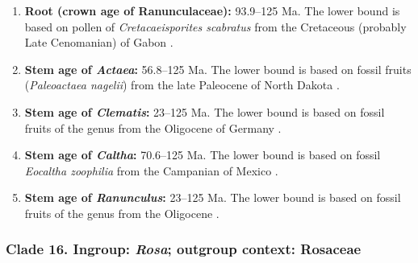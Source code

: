 \documentclass[10pt]{article}
\begin{document}
\begin{enumerate}
\item \textbf{Root (crown age of Ranunculaceae):} 93.9--125 Ma. The
  lower bound is based on pollen of \textit{Cretacaeisporites
    scabratus} from the Cretaceous (probably Late Cenomanian) of Gabon
  \citep{Ward1994}.

\item \textbf{Stem age of \textit{Actaea}:} 56.8--125 Ma. The lower
  bound is based on fossil fruits (\textit{Paleoactaea nagelii}) from
  the late Paleocene of North Dakota \citep{Pigg2005}.

\item \textbf{Stem age of \textit{Clematis}:} 23--125 Ma. The lower
  bound is based on fossil fruits of the genus from the Oligocene of
  Germany \citep{Weyland1938}.

\item \textbf{Stem age of \textit{Caltha}:} 70.6--125 Ma. The lower
  bound is based on fossil \textit{Eocaltha zoophilia} from the
  Campanian of Mexico \citep{Rodriguez1998}.

\item \textbf{Stem age of \textit{Ranunculus}:} 23--125 Ma. The
  lower bound is based on fossil fruits of the genus from the
  Oligocene \citep{Mai1985}.

\end{enumerate}


\subsubsection*{Clade 16. Ingroup: \textit{Rosa}; outgroup context:
  Rosaceae}

\end{document}
